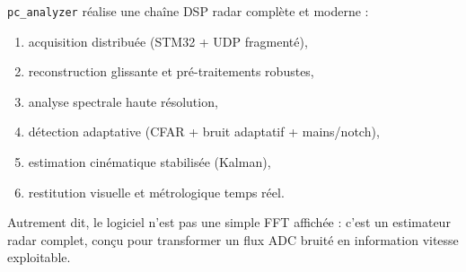 \documentclass[a4paper,11pt]{article}
\begin{document}
\texttt{pc\_analyzer} r\'ealise une cha\^ine DSP radar compl\`ete et moderne :
\begin{enumerate}[leftmargin=2em]
  \item acquisition distribu\'ee (STM32 + UDP fragment\'e),
  \item reconstruction glissante et pr\'e-traitements robustes,
  \item analyse spectrale haute r\'esolution,
  \item d\'etection adaptative (CFAR + bruit adaptatif + mains/notch),
  \item estimation cin\'ematique stabilis\'ee (Kalman),
  \item restitution visuelle et m\'etrologique temps r\'eel.
\end{enumerate}

Autrement dit, le logiciel n'est pas une simple FFT affich\'ee : c'est un estimateur radar complet, con\c{c}u pour transformer un flux ADC bruit\'e en information vitesse exploitable.
\end{document}
